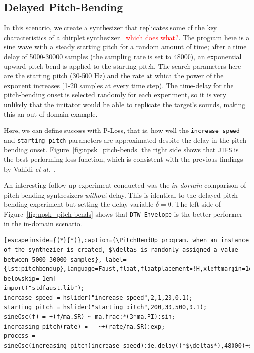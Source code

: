 \documentclass{article} %
\newcommand{\todo}[1]{\textcolor{red}{#1}}
\newcommand{\JTFS}{\texttt{JTFS}\xspace}
\newcommand{\DTWEnv}{\texttt{DTW\_Envelope}\xspace}
\newcommand{\PitchBendUp}{\textbf{PitchBend-Up}\xspace}
\begin{document}
\subsection{Delayed Pitch-Bending}
In this scenario, we create a synthesizer that replicates some of the key characteristics of a chirplet synthesizer~\cite{vahidi2023mesostructures} \todo{which does what?}. The program here is a sine wave with a steady starting pitch for a random amount of time; after a time delay of 5000-30000 samples (the sampling rate is set to 48000), an exponential upward pitch bend is applied to the starting pitch. The search parameters here are the starting pitch (30-500 Hz) and the rate at which the power of the exponent increases (1-20 samples at every time step). The time-delay for the pitch-bending onset is selected randomly for each experiment, so it is very unlikely that the imitator would be able to replicate the target's sounds, making this an out-of-domain example.

Here, we can define success with P-Loss, that is, how well the \texttt{increase\_speed} and \texttt{starting\_pitch} parameters are approximated despite the delay in the pitch-bending onset. Figure~\ref{fig:npsk_pitch-bends} the right side shows that \JTFS is the best performing loss function, which is consistent with the previous findings by Vahidi \textit{et al.}~\cite{vahidi2023mesostructures}. 

An interesting follow-up experiment conducted was the \textit{in-domain} comparison of pitch-bending synthesizers \textit{without} delay. This is identical to the delayed pitch-bending experiment but setting the delay variable $\delta=0$. The left side of Figure~\ref{fig:npsk_pitch-bends} shows that \DTWEnv is the better performer in the in-domain scenario.

\begin{lstlisting}[escapeinside={(*}{*)},caption={\PitchBendUp program. when an instance of the synthezier is created, $\delta$ is randomly assigned a value between 5000-30000 samples}, label={lst:pitchbendup},language=Faust,float,floatplacement=!H,xleftmargin=1em,xrightmargin=0.5em,firstnumber=0,aboveskip=0em, belowskip=-1em]
import("stdfaust.lib");
increase_speed = hslider("increase_speed",2,1,20,0.1);
starting_pitch = hslider("starting_pitch",200,30,500,0.1);
sineOsc(f) = +(f/ma.SR) ~ ma.frac:*(3*ma.PI):sin;
increasing_pitch(rate) = _ ~+(rate/ma.SR):exp;
process = sineOsc(increasing_pitch(increase_speed):de.delay((*$\delta$*),48000)+starting_pitch);

\end{lstlisting}
\end{document}
